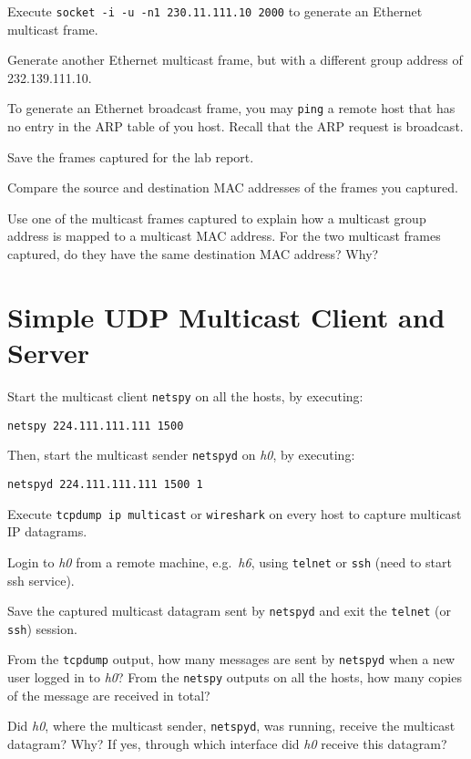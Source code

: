 \documentclass{../UTNetLab}
\begin{document}
    Execute \lstinline{socket -i -u -n1 230.11.111.10 2000} to generate an Ethernet multicast frame.

    Generate another Ethernet multicast frame, but with a different group address of {232.139.111.10}.

    To generate an Ethernet broadcast frame, you may \lstinline{ping} a remote host that has no entry in the ARP table of you host.
    Recall that the ARP request is broadcast.

    Save the frames captured for the lab report.

    \begin{report}
    \item Compare the source and destination MAC addresses of the frames you captured.

    \item Use one of the multicast frames captured to explain how a multicast group address is mapped to a multicast MAC address.
    For the two multicast frames captured, do they have the same destination MAC address?
    Why?
    \end{report}

\section{Simple UDP Multicast Client and Server}
    Start the multicast client \lstinline{netspy} on all the hosts, by executing:
    \begin{lstlisting}
netspy 224.111.111.111 1500
    \end{lstlisting}
    Then, start the multicast sender \lstinline{netspyd} on \textit{h0}, by executing:
    \begin{lstlisting}
netspyd 224.111.111.111 1500 1
    \end{lstlisting}
    Execute \lstinline{tcpdump ip multicast} or \lstinline{wireshark} on every host to capture multicast IP datagrams.

    Login to \textit{h0} from a remote machine, e.g.\ \textit{h6}, using \lstinline{telnet} or \lstinline{ssh} (need to start ssh service).

    Save the captured multicast datagram sent by \lstinline{netspyd} and exit the \lstinline{telnet} (or \lstinline{ssh}) session.

    \begin{report}
    \item From the \lstinline{tcpdump} output, how many messages are sent by \lstinline{netspyd} when a new user logged in to \textit{h0}?
    From the \lstinline{netspy} outputs on all the hosts, how many copies of the message are received in total?

    \item Did \textit{h0}, where the multicast sender, \lstinline{netspyd}, was running, receive the multicast datagram?
    Why?
    If yes, through which interface did \textit{h0} receive this datagram?
    \end{report}
\end{document}

